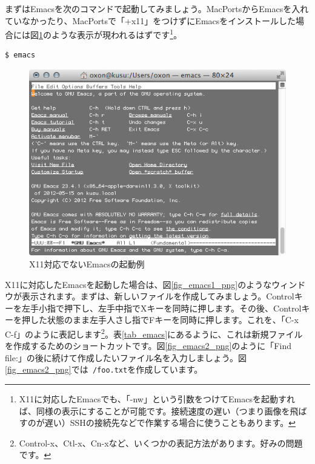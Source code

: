 まずはEmacsを次のコマンドで起動してみましょう。MacPortsからEmacsを入れていなかったり、MacPortsで「+x11」をつけずにEmacsをインストールした場合には図\ref{fig_emacs_nox11_png}のような表示が現われるはずです\footnote{X11に対応したEmacsでも、「-nw」という引数をつけてEmacsを起動すれば、同様の表示にすることが可能です。接続速度の遅い（つまり画像を飛ばすのが遅い）SSHの接続先などで作業する場合に使うこともあります。}。

\begin{lstlisting}[language=bash]
$ emacs
\end{lstlisting}

\begin{figure}
  \begin{center}
    \includegraphics[scale=0.35,bb= 0 0 505 366]{fig/emacs_nox11.png}
    \caption{X11対応でないEmacsの起動例}
    \label{fig_emacs_nox11_png}
  \end{center}
\end{figure}

X11に対応したEmacsを起動した場合は、図\ref{fig_emacs1_png}のようなウィンドウが表示されます。まずは、新しいファイルを作成してみましょう。Controlキーを左手小指で押下し、左手中指でXキーを同時に押します。その後、Controlキーを押した状態のまま左手人さし指でFキーを同時に押します。これを、「C-x C-f」のように表記します\footnote{Control-x、Ctl-x、Cn-xなど、いくつかの表記方法があります。好みの問題です。}。表\ref{tab_emacs}にあるように、これは新規ファイルを作成するためのショートカットです。図\ref{fig_emacs2_png}のように「Find file:」の後に続けて作成したいファイル名を入力しましょう。図\ref{fig_emacs2_png}では\texttt{~/foo.txt}を作成しています。

